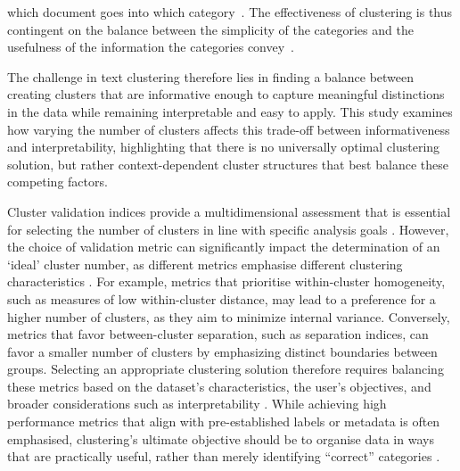 \documentclass{article}
\begin{document}
which document goes into which category~\cite{roschPrinciplesCategorization1978}.  The effectiveness of clustering is thus contingent on the balance between the simplicity of the categories and the usefulness of the information the categories convey~\cite{hennig2019cluster}.

The challenge in text clustering therefore lies in finding a balance between creating clusters that are informative enough to capture meaningful distinctions in the data while remaining interpretable and easy to apply. This study examines how varying the number of clusters affects this trade-off between informativeness and interpretability, highlighting that there is no universally optimal clustering solution, but rather context-dependent cluster structures that best balance these competing factors.





Cluster validation indices provide a multidimensional assessment that is essential for selecting the number of clusters in line with specific analysis goals \cite{hennig2019cluster}. However, the choice of validation metric can significantly impact the determination of an `ideal' cluster number, as different metrics emphasise different clustering characteristics \cite{akhanliComparingClusteringsNumbers2020}.  For example, metrics that prioritise within-cluster homogeneity, such as measures of low within-cluster distance, may lead to a preference for a higher number of clusters, as they aim to minimize internal variance. Conversely, metrics that favor between-cluster separation, such as separation indices, can favor a smaller number of clusters by emphasizing distinct boundaries between groups. Selecting an appropriate clustering solution therefore requires balancing these metrics based on the dataset's characteristics, the user's objectives, and broader considerations such as interpretability \cite{grimmer2021machine}. 
While achieving high performance metrics that align with pre-established labels or metadata is often emphasised, clustering's ultimate objective should be to organise data in ways that are practically useful, rather than merely identifying ``correct'' categories \cite{pedryczFuzzyClusteringKnowledgebased2004, lakhawatNovelClusteringAlgorithm2016, krausMultiobjectiveSelectionCollecting2011, krishnapuramPossibilisticApproachClustering1993, akhanliComparingClusteringsNumbers2020}.
\end{document}
